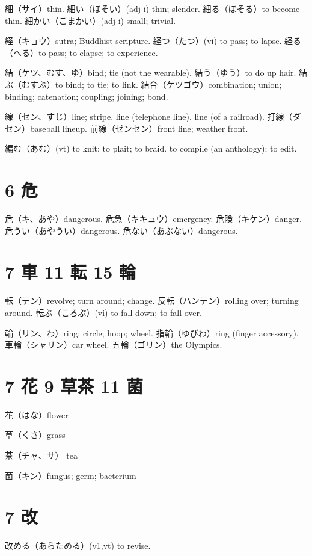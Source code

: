 細（サイ）thin.
細い（ほそい）(adj-i) thin; slender.
細る（ほそる）to become thin.
細かい（こまかい）(adj-i) small; trivial.

経（キョウ）sutra; Buddhist scripture.
経つ（たつ）(vi) to pass; to lapse.
経る（へる）to pass; to elapse; to experience.

結（ケツ、むす、ゆ）bind; tie (not the wearable).
結う（ゆう）to do up hair.
結ぶ（むすぶ）to bind; to tie; to link.
結合（ケツゴウ）combination; union; binding; catenation; coupling; joining; bond.

線（セン、すじ）line; stripe.
line (telephone line).
line (of a railroad).
打線（ダセン）baseball lineup.
前線（ゼンセン）front line; weather front.

編む（あむ）(vt)
to knit; to plait; to braid.
to compile (an anthology); to edit.

\section{6 危}

危（キ、あや）dangerous.
危急（キキュウ）emergency.
危険（キケン）danger.
危うい（あやうい）dangerous.
危ない（あぶない）dangerous.

\section{7 車 11 転 15 輪}

転（テン）revolve; turn around; change.
反転（ハンテン）rolling over; turning around.
転ぶ（ころぶ）(vi) to fall down; to fall over.

輪（リン、わ）ring; circle; hoop; wheel.
指輪（ゆびわ）ring (finger accessory).
車輪（シャリン）car wheel.
五輪（ゴリン）the Olympics.

\section{7 花 9 草茶 11 菌}

花（はな）flower

草（くさ）grass

茶（チャ、サ） tea

菌（キン）fungus; germ; bacterium

\section{7 改}

改める（あらためる）(v1,vt) to revise.

